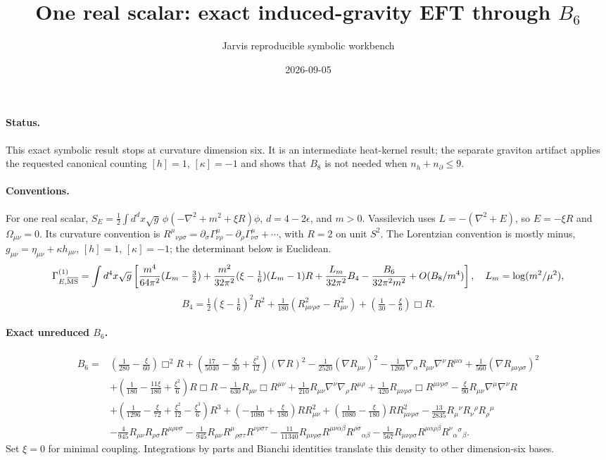 \documentclass[11pt]{article}
\title{One real scalar: exact induced-gravity EFT through $B_6$}
\author{Jarvis reproducible symbolic workbench}
\date{2026-09-05}
\begin{document}
\maketitle
\paragraph{Status.} This exact symbolic result stops at curvature dimension six. It is an intermediate heat-kernel result; the separate graviton artifact applies the requested canonical counting $[h]=1$, $[\kappa]=-1$ and shows that $B_8$ is not needed when $n_h+n_\partial\leq9$.
\paragraph{Conventions.} For one real scalar, $S_E=\tfrac12\int d^dx\sqrt g\,\phi(-\nabla^2+m^2+\xi R)\phi$, $d=4-2\epsilon$, and $m>0$. Vassilevich uses $L=-(\nabla^2+E)$, so $E=-\xi R$ and $\Omega_{\mu\nu}=0$. Its curvature convention is $R^\mu{}_{\nu\rho\sigma}=\partial_\sigma\Gamma^\mu_{\nu\rho}-\partial_\rho\Gamma^\mu_{\nu\sigma}+\cdots$, with $R=2$ on unit $S^2$. The Lorentzian convention is mostly minus, $g_{\mu\nu}=\eta_{\mu\nu}+\kappa h_{\mu\nu}$, $[h]=1$, $[\kappa]=-1$; the determinant below is Euclidean.
\[
\Gamma^{(1)}_{E,\overline{\rm MS}}=\int d^4x\sqrt g\left[\frac{m^4}{64\pi^2}(L_m-\tfrac32)+\frac{m^2}{32\pi^2}(\xi-\tfrac16)(L_m-1)R+\frac{L_m}{32\pi^2}B_4-\frac{B_6}{32\pi^2m^2}+O(B_8/m^4)\right],\quad L_m=\log(m^2/\mu^2),
\]
\[
B_4=\tfrac12(\xi-\tfrac16)^2R^2+\tfrac1{180}(R_{\mu\nu\rho\sigma}^2-R_{\mu\nu}^2)+(\tfrac1{30}-\tfrac\xi6)\Box R.
\]
\paragraph{Exact unreduced $B_6$.}
\begin{align*}
B_6={}&(\tfrac1{280}-\tfrac\xi{60})\Box^2R+(\tfrac{17}{5040}-\tfrac\xi{30}+\tfrac{\xi^2}{12})(\nabla R)^2-\tfrac1{2520}(\nabla R_{\mu\nu})^2-\tfrac1{1260}\nabla_\alpha R_{\mu\nu}\nabla^\nu R^{\mu\alpha}+\tfrac1{560}(\nabla R_{\mu\nu\rho\sigma})^2\\
&+(\tfrac1{180}-\tfrac{11\xi}{180}+\tfrac{\xi^2}{6})R\Box R-\tfrac1{630}R_{\mu\nu}\Box R^{\mu\nu}+\tfrac1{210}R_{\mu\nu}\nabla^\nu\nabla_\rho R^{\mu\rho}+\tfrac1{420}R_{\mu\nu\rho\sigma}\Box R^{\mu\nu\rho\sigma}-\tfrac\xi{90}R_{\mu\nu}\nabla^\mu\nabla^\nu R\\
&+(\tfrac1{1296}-\tfrac\xi{72}+\tfrac{\xi^2}{12}-\tfrac{\xi^3}{6})R^3+(-\tfrac1{1080}+\tfrac\xi{180})RR_{\mu\nu}^2+(\tfrac1{1080}-\tfrac\xi{180})RR_{\mu\nu\rho\sigma}^2-\tfrac{13}{2835}R_\mu{}^\nu R_\nu{}^\rho R_\rho{}^\mu\\
&-\tfrac4{945}R_{\mu\nu}R_{\rho\sigma}R^{\mu\rho\nu\sigma}-\tfrac1{945}R_{\mu\nu}R^\mu{}_{\rho\sigma\tau}R^{\nu\rho\sigma\tau}-\tfrac{11}{11340}R_{\mu\nu\rho\sigma}R^{\mu\nu\alpha\beta}R^{\rho\sigma}{}_{\alpha\beta}-\tfrac1{567}R_{\mu\nu\rho\sigma}R^{\mu\alpha\rho\beta}R^\nu{}_{\alpha}{}^\sigma{}_{\beta}.
\end{align*}
Set $\xi=0$ for minimal coupling. Integrations by parts and Bianchi identities translate this density to other dimension-six bases.
\end{document}
